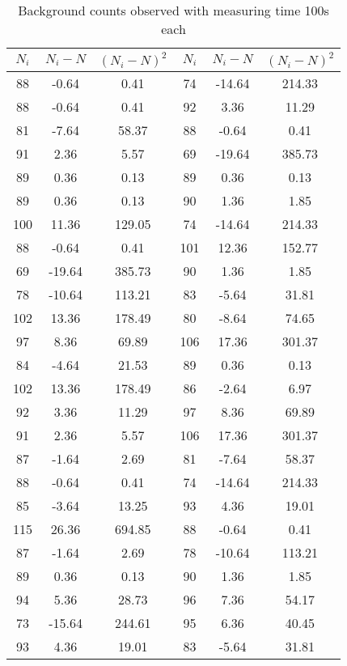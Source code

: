 \begin{table}[H]
    \centering
    \begin{tabular}{|ccc|ccc|}\hline
        $N_i$ & $N_i-N$ & $(N_i-N)^2$ & $N_i$ & $N_i-N$ & $(N_i-N)^2$ \\\hline
        88 & -0.64 & 0.41 & 74 & -14.64 & 214.33 \\
        88 & -0.64 & 0.41 & 92 & 3.36 & 11.29 \\
        81 & -7.64 & 58.37 & 88 & -0.64 & 0.41 \\
        91 & 2.36 & 5.57 & 69 & -19.64 & 385.73 \\
        89 & 0.36 & 0.13 & 89 & 0.36 & 0.13 \\
        89 & 0.36 & 0.13 & 90 & 1.36 & 1.85 \\
        100 & 11.36 & 129.05 & 74 & -14.64 & 214.33 \\
        88 & -0.64 & 0.41 & 101 & 12.36 & 152.77 \\
        69 & -19.64 & 385.73 & 90 & 1.36 & 1.85 \\
        78 & -10.64 & 113.21 & 83 & -5.64 & 31.81 \\
        102 & 13.36 & 178.49 & 80 & -8.64 & 74.65 \\
        97 & 8.36 & 69.89 & 106 & 17.36 & 301.37 \\
        84 & -4.64 & 21.53 & 89 & 0.36 & 0.13 \\
        102 & 13.36 & 178.49 & 86 & -2.64 & 6.97 \\
        92 & 3.36 & 11.29 & 97 & 8.36 & 69.89 \\
        91 & 2.36 & 5.57 & 106 & 17.36 & 301.37 \\
        87 & -1.64 & 2.69 & 81 & -7.64 & 58.37 \\
        88 & -0.64 & 0.41 & 74 & -14.64 & 214.33 \\
        85 & -3.64 & 13.25 & 93 & 4.36 & 19.01 \\
        115 & 26.36 & 694.85 & 88 & -0.64 & 0.41 \\
        87 & -1.64 & 2.69 & 78 & -10.64 & 113.21 \\
        89 & 0.36 & 0.13 & 90 & 1.36 & 1.85 \\
        94 & 5.36 & 28.73 & 96 & 7.36 & 54.17 \\
        73 & -15.64 & 244.61 & 95 & 6.36 & 40.45 \\
        93 & 4.36 & 19.01 & 83 & -5.64 & 31.81 \\ \hline
    \end{tabular}
    \caption{Background counts observed with measuring time 100s each}
    \label{t8}
\end{table}